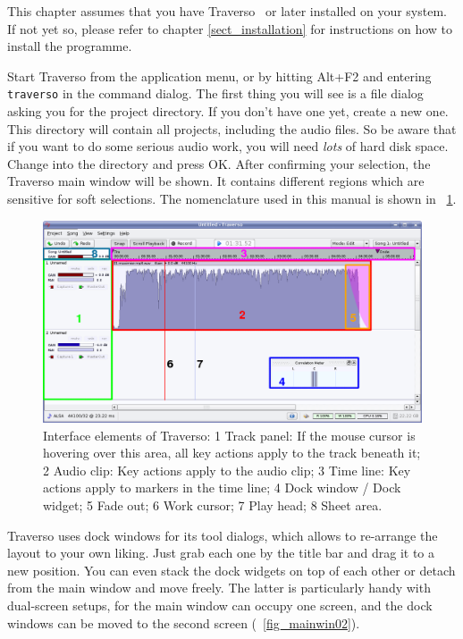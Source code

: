 This chapter assumes that you have Traverso \Version\ or later installed on your system. If not yet so, please refer to chapter \ref{sect_installation} for instructions on how to install the programme.

Start Traverso from the application menu, or by hitting Alt+F2 and entering \texttt{traverso} in the command dialog. The first thing you will see is a file dialog asking you for the project directory. If you don't have one yet, create a new one. This directory will contain all projects, including the audio files. So be aware that if you want to do some serious audio work, you will need \emph{lots} of hard disk space. Change into the directory and press OK. After confirming your selection, the Traverso main window will be shown. It contains different regions which are sensitive for soft selections. The nomenclature used in this manual is shown in \FigT\ \ref{fig_gui01}.

\begin{figure}
 \centering\includegraphics[width=\textwidth]{images/sshot06.png}
 \caption{Interface elements of Traverso: 1 Track panel: If the mouse cursor is hovering over this area, all key actions apply to the track beneath it; 2 Audio clip: Key actions apply to the audio clip; 3 Time line: Key actions apply to markers in the time line; 4 Dock window / Dock widget; 5 Fade out; 6 Work cursor; 7 Play head; 8 Sheet area.}
 \label{fig_gui01}
\end{figure}

Traverso uses dock windows for its tool dialogs, which allows to re-arrange the layout to your own liking. Just grab each one by the title bar and drag it to a new position. You can even stack the dock widgets on top of each other or detach from the main window and move freely. The latter is particularly handy with dual-screen setups, for the main window can occupy one screen, and the dock windows can be moved to the second screen (\FigB\ \ref{fig_mainwin02}).

